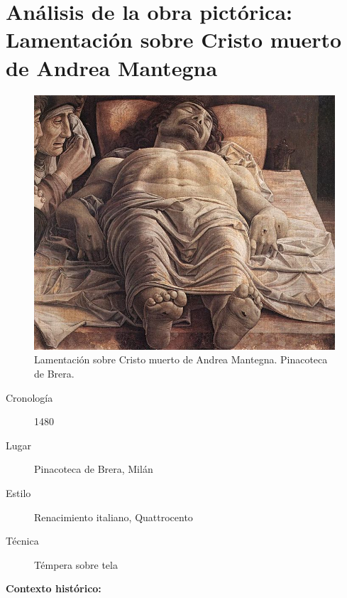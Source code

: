 \section{Análisis de la obra pictórica: Lamentación sobre Cristo muerto de Andrea Mantegna}

\begin{figure}[ht!]
	\includegraphics[width=\textwidth]{mantegna.jpg}
	\caption{Lamentación sobre Cristo muerto de Andrea Mantegna. Pinacoteca de Brera.} %
\end{figure}

\newpage

\begin{description}
\item[Cronología] 1480
\item[Lugar] Pinacoteca de Brera, Milán
\item[Estilo] Renacimiento italiano, Quattrocento
\item[Técnica] Témpera sobre tela
\end{description}

\textbf{Contexto histórico:}

